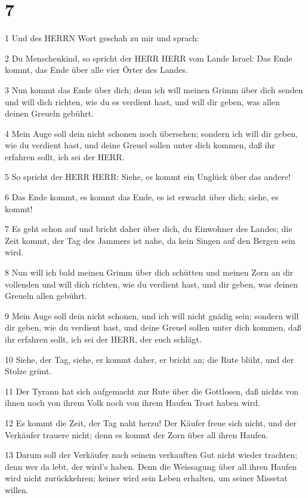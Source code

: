\chapter{7}

\par 1 Und des HERRN Wort geschah zu mir und sprach:
\par 2 Du Menschenkind, so spricht der HERR HERR vom Lande Israel: Das Ende kommt, das Ende über alle vier Örter des Landes.
\par 3 Nun kommt das Ende über dich; denn ich will meinen Grimm über dich senden und will dich richten, wie du es verdient hast, und will dir geben, was allen deinen Greueln gebührt.
\par 4 Mein Auge soll dein nicht schonen noch übersehen; sondern ich will dir geben, wie du verdient hast, und deine Greuel sollen unter dich kommen, daß ihr erfahren sollt, ich sei der HERR.
\par 5 So spricht der HERR HERR: Siehe, es kommt ein Unglück über das andere!
\par 6 Das Ende kommt, es kommt das Ende, es ist erwacht über dich; siehe, es kommt!
\par 7 Es geht schon auf und bricht daher über dich, du Einwohner des Landes; die Zeit kommt, der Tag des Jammers ist nahe, da kein Singen auf den Bergen sein wird.
\par 8 Nun will ich bald meinen Grimm über dich schütten und meinen Zorn an dir vollenden und will dich richten, wie du verdient hast, und dir geben, was deinen Greueln allen gebührt.
\par 9 Mein Auge soll dein nicht schonen, und ich will nicht gnädig sein; sondern will dir geben, wie du verdient hast, und deine Greuel sollen unter dich kommen, daß ihr erfahren sollt, ich sei der HERR, der euch schlägt.
\par 10 Siehe, der Tag, siehe, er kommt daher, er bricht an; die Rute blüht, und der Stolze grünt.
\par 11 Der Tyrann hat sich aufgemacht zur Rute über die Gottlosen, daß nichts von ihnen noch von ihrem Volk noch von ihrem Haufen Trost haben wird.
\par 12 Es kommt die Zeit, der Tag naht herzu! Der Käufer freue sich nicht, und der Verkäufer trauere nicht; denn es kommt der Zorn über all ihren Haufen.
\par 13 Darum soll der Verkäufer nach seinem verkauften Gut nicht wieder trachten; denn wer da lebt, der wird's haben. Denn die Weissagung über all ihren Haufen wird nicht zurückkehren; keiner wird sein Leben erhalten, um seiner Missetat willen.
